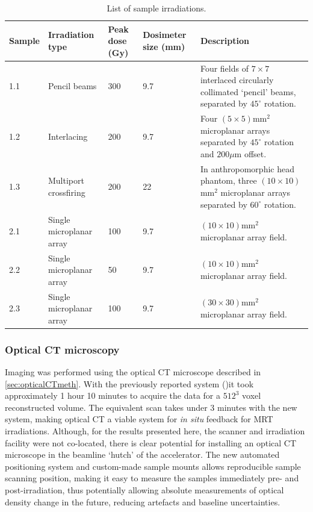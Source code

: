 	\begin{table}[H]
		\centering
		\begin{tabular}{ p{1.4cm} | p{3cm} |p{1cm} | p{2cm} |p{6.5cm}  }
			\textbf{Sample} & \textbf{Irradiation type} &\textbf{Peak dose (Gy)}   &\textbf{Dosimeter size (mm)} & \textbf{Description} \\ \hline
			1.1  & Pencil beams & 300  & 9.7 & Four fields of $7\times 7$ interlaced circularly collimated `pencil' beams, separated by  $45^{\circ}$ rotation. \\ \hline
			1.2  & Interlacing & 200  & 9.7 & Four $(5\times 5)$mm$^2$ microplanar arrays separated by $45^{\circ}$ rotation and $200\mu $m offset. \\ \hline
			1.3  & Multiport crossfiring & 200  & 22 & In anthropomorphic head phantom, three $(10\times 10)$mm$^2$ microplanar arrays separated by $60^{\circ}$ rotation. \\ \hline
			2.1  & Single microplanar array & 100  & 9.7 & $(10\times 10)$mm$^2$ microplanar array field. \\ \hline
			2.2  & Single microplanar array & 50  & 9.7 & $(10\times 10)$mm$^2$ microplanar array field. \\ \hline
			2.3  & Single microplanar array & 100  & 9.7 & $(30\times 30)$mm$^2$ microplanar array field. \\ %
		\end{tabular}
		\caption{List of sample irradiations.}
		\label{table:samples}
	\end{table}
	
	
	\subsubsection{Optical CT microscopy}
	Imaging was performed using the optical CT microscope described in \ref{sec:opticalCTmeth}. With the previously reported system (\cite{doranestablishing2013})it took approximately 1 hour 10 minutes to acquire the data for a $512^3$ voxel reconstructed volume. The equivalent scan takes under 3 minutes with the new system, making optical CT a viable system for \emph{in situ} feedback for MRT irradiations. Although, for the results presented here, the scanner and irradiation facility were not co-located, there is clear potential for installing an optical CT microscope in the beamline `hutch' of the accelerator. The new automated positioning system and custom-made sample mounts allows reproducible sample scanning position, making it easy to measure the samples immediately pre- and post-irradiation, thus potentially allowing absolute measurements of optical density change in the future, reducing artefacts and baseline uncertainties. 

